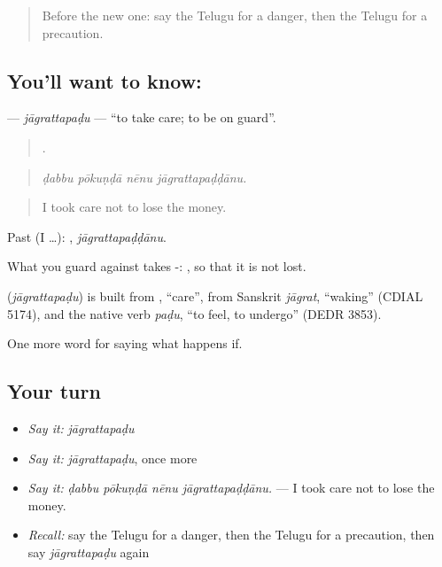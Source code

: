 \label{lesson:TE-C421-jagrattapadu}



\begin{quote}
Before the new one: say the Telugu for a danger, then the Telugu for a precaution.
\end{quote}

\subsection*{You'll want to know: }
\textbf{} — \emph{jāgrattapaḍu} — \textquotedblleft{}to take care; to be on guard\textquotedblright{}.

\begin{quote}
   .
\end{quote}

\begin{quote}
\emph{ḍabbu pōkuṇḍā nēnu jāgrattapaḍḍānu.}
\end{quote}

\begin{quote}
I took care not to lose the money.
\end{quote}

Past (I …): , \emph{jāgrattapaḍḍānu}.

What you guard against takes -: , so that it is not lost.

\begin{cousinweb}
\textbf{} (\emph{jāgrattapaḍu}) is built from , \textquotedblleft{}care\textquotedblright{}, from Sanskrit \emph{jāgrat}, \textquotedblleft{}waking\textquotedblright{} (CDIAL 5174), and the native verb \emph{paḍu}, \textquotedblleft{}to feel, to undergo\textquotedblright{} (DEDR 3853).
\end{cousinweb}

\begin{grammarlens}[title={What you've built}]
One more word for saying what happens if.
\end{grammarlens}

\subsection*{Your turn}
\begin{itemize}
\raggedright
  \item \emph{Say it:} \emph{jāgrattapaḍu}
  \item \emph{Say it:} \emph{jāgrattapaḍu}, once more
  \item \emph{Say it:} \emph{ḍabbu pōkuṇḍā nēnu jāgrattapaḍḍānu.} — I took care not to lose the money.
  \item \emph{Recall:} say the Telugu for a danger, then the Telugu for a precaution, then say \emph{jāgrattapaḍu} again
\end{itemize}

